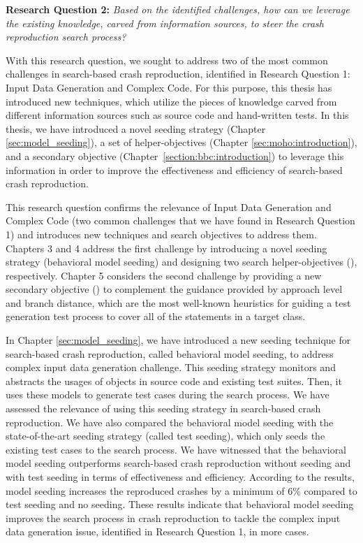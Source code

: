 \textbf{Research Question 2: }\textit{Based on the identified challenges, how can we leverage the existing knowl\-edge, carved from information sources, to steer the crash reproduction search process?}


With this research question, we sought to address two of the most common challenges in search-based crash reproduction, identified in Research Question 1: Input Data Generation and Complex Code. For this purpose, this thesis has introduced new techniques, which utilize the pieces of knowledge carved from different information sources such as source code and hand-written tests. In this thesis, we have introduced a novel seeding strategy (Chapter \ref{sec:model_seeding}), a set of helper-objectives (Chapter \ref{sec:moho:introduction}), and a secondary objective (Chapter~\ref{section:bbc:introduction}) to leverage this information in order to improve the effectiveness and efficiency of search-based crash reproduction.

This research question confirms the relevance of Input Data Generation and Complex Code (two common challenges that we have found in Research Question 1) and introduces new techniques and search objectives to address them. Chapters 3 and 4 address the first challenge by introducing a novel seeding strategy (behavioral model seeding) and designing two search helper-objectives (\moho), respectively. 
Chapter 5 considers the second challenge by providing a new secondary objective (\bbc) to complement the guidance provided by approach level and branch distance, which are the most well-known heuristics for guiding a test generation test process to cover all of the statements in a target class.

In Chapter \ref{sec:model_seeding}, we have introduced a new seeding technique for search-based crash reproduction, called behavioral model seeding, to address complex input data generation challenge. This seeding strategy monitors and abstracts the usages of objects in source code and existing test suites. Then, it uses these models to generate test cases during the search process.
We have assessed the relevance of using this seeding strategy in search-based crash reproduction. We have also compared the behavioral model seeding with the state-of-the-art seeding strategy (called test seeding), which only seeds the existing test cases to the search process. We have witnessed that the behavioral model seeding outperforms search-based crash reproduction without seeding and with test seeding in terms of effectiveness and efficiency. According to the results, model seeding increases the reproduced crashes by a minimum of 6\% compared to test seeding and no seeding. These results indicate that behavioral model seeding improves the search process in crash reproduction to tackle the complex input data generation issue, identified in Research Question 1, in more cases.

